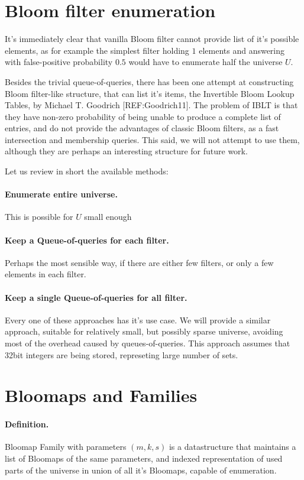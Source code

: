\section{Bloom filter enumeration}

It's immediately clear that vanilla Bloom filter cannot provide list of it's
possible elements, as for example the simplest filter holding $1$ elements and
answering with false-positive probability $0.5$ would have to enumerate half the
universe $U$.

Besides the trivial queue-of-queries, there has been one attempt at constructing
Bloom filter-like structure, that can list it's items, the Invertible Bloom
Lookup Tables, by Michael T. Goodrich [REF:Goodrich11]. The problem of IBLT is
that they have non-zero probability of being unable to produce a complete list
of entries, and do not provide the advantages of classic Bloom filters, as a
fast intersection and membership queries. This said, we will not attempt to use
them, although they are perhaps an interesting structure for future work.

Let us review in short the available methods:

\paragraph{Enumerate entire universe.} This is possible for $U$ small enough
\paragraph{Keep a Queue-of-queries for each filter.} Perhaps the most sensible
way, if there are either few filters, or only a few elements in each filter.
\paragraph{Keep a single Queue-of-queries for all filter.}

Every one of these approaches has it's use case. We will provide a similar
approach, suitable for relatively small, but possibly sparse universe, avoiding
most of the overhead caused by queues-of-queries. This approach assumes that
32bit integers are being stored, represeting large number of sets.

\section{Bloomaps and Families}

\paragraph{Definition.} Bloomap Family with parameters $(m, k, s)$ is a
datastructure that maintains a list of Bloomaps of the same parameters, and
indexed representation of used parts of the universe in union of all it's
Bloomaps, capable of enumeration.


